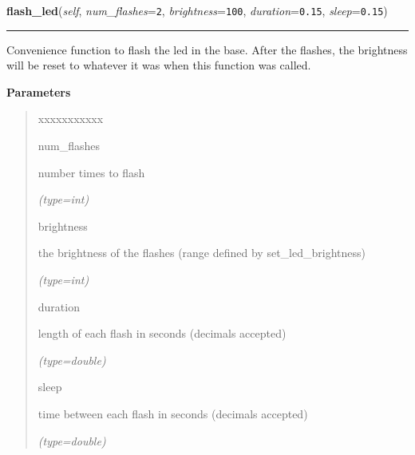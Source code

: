     \label{PowerMateEventHandler:PowerMateEventHandler:flash_led}

    \vspace{0.5ex}

\hspace{.8\funcindent}\begin{boxedminipage}{\funcwidth}

    \raggedright \textbf{flash\_led}(\textit{self}, \textit{num\_flashes}={\tt 2}, \textit{brightness}={\tt 100}, \textit{duration}={\tt 0.15}, \textit{sleep}={\tt 0.15})

    \vspace{-1.5ex}

    \rule{\textwidth}{0.5\fboxrule}
\setlength{\parskip}{2ex}
    Convenience function to flash the led in the base. After the flashes, 
    the brightness will be reset to whatever it was when this function was 
    called.

\setlength{\parskip}{1ex}
      \textbf{Parameters}
      \vspace{-1ex}

      \begin{quote}
        \begin{Ventry}{xxxxxxxxxxx}

          \item[num\_flashes]

          number times to flash

            {\it (type=int)}

          \item[brightness]

          the brightness of the flashes (range defined by 
          set\_led\_brightness)

            {\it (type=int)}

          \item[duration]

          length of each flash in seconds (decimals accepted)

            {\it (type=double)}

          \item[sleep]

          time between each flash in seconds (decimals accepted)

            {\it (type=double)}

        \end{Ventry}

      \end{quote}

    \end{boxedminipage}

